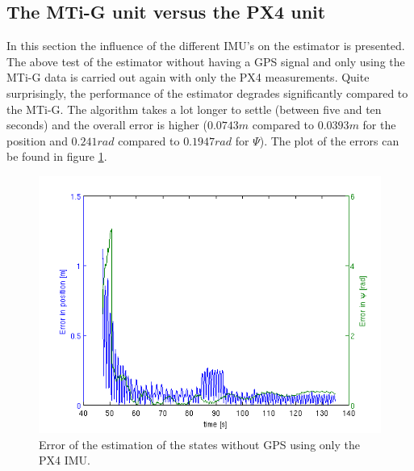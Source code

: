 \subsection{The MTi-G unit versus the PX4 unit}\label{IMU_comp}
In this section the influence of the different IMU's on the estimator is presented. The above test of the estimator without having a GPS signal and only using the MTi-G data is carried out again with only the PX4 measurements. %
Quite surprisingly, the performance of the estimator degrades significantly compared to the MTi-G. The algorithm takes a lot longer to settle (between five and ten seconds) and the overall error is higher ($0.0743 m$ compared to $0.0393 m$ for the position and $0.241 rad$ compared to $0.1947 rad$ for $\Psi$). The plot of the errors can be found in figure \ref{error_noGPS_P}. 
\begin{figure}[h]
\centering
\includegraphics[width=1\textwidth]{pictures/2_2_P_errors_noGPS.png}
\caption{Error of the estimation of the states without GPS using only the PX4 IMU.}
\label{error_noGPS_P}
\end{figure}

